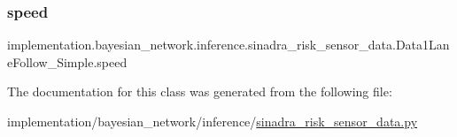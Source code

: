 \subsubsection{\texorpdfstring{speed}{speed}}
{\footnotesize\ttfamily implementation.\+bayesian\+\_\+network.\+inference.\+sinadra\+\_\+risk\+\_\+sensor\+\_\+data.\+Data1\+Lane\+Follow\+\_\+\+Simple.\+speed}



The documentation for this class was generated from the following file\+:\begin{DoxyCompactItemize}
\item 
implementation/bayesian\+\_\+network/inference/\hyperlink{sinadra__risk__sensor__data_8py}{sinadra\+\_\+risk\+\_\+sensor\+\_\+data.\+py}\end{DoxyCompactItemize}

